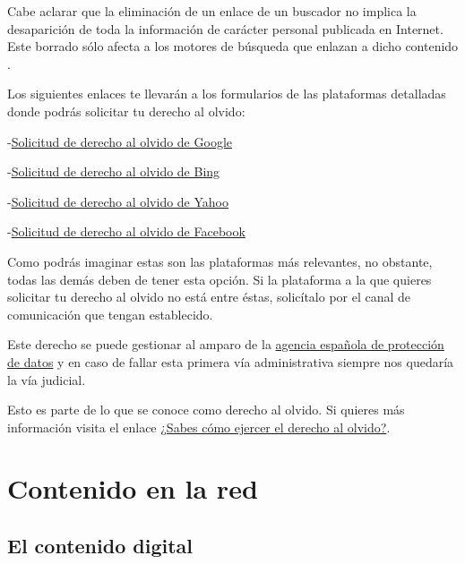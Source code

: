 \documentclass[
  a4paper,
  openany]{book}
\begin{document}
Cabe aclarar que la eliminación de un enlace de un buscador no implica la desaparición de toda la información de carácter personal publicada en Internet. Este borrado sólo afecta a los motores de búsqueda que enlazan a dicho contenido \citep{OSI-derecho-al-olvido}.

Los siguientes enlaces te llevarán a los formularios de las plataformas detalladas donde podrás solicitar tu derecho al olvido:

-\href{https://support.google.com/websearch/troubleshooter/3111061?hl=es}{Solicitud de derecho al olvido de Google}

-\href{https://help.bing.microsoft.com/\#apex/18/ES/10013/-1/ES}{Solicitud de derecho al olvido de Bing}

-\href{https://es-us.ayuda.yahoo.com/kb/Eliminaci\%C3\%B3n-de-resultados-de-b\%C3\%BAsqueda-de-Yahoo-Search-sln4530.html}{Solicitud de derecho al olvido de Yahoo}

-\href{https://www.facebook.com/help/217091804975136}{Solicitud de derecho al olvido de Facebook}

Como podrás imaginar estas son las plataformas más relevantes, no obstante, todas las demás deben de tener esta opción. Si la plataforma a la que quieres solicitar tu derecho al olvido no está entre éstas, solicítalo por el canal de comunicación que tengan establecido.

Este derecho se puede gestionar al amparo de la \href{https://www.aepd.es/es/areas-de-actuacion/internet-y-redes-sociales/derecho-al-olvido}{agencia española de protección de datos} y en caso de fallar esta primera vía administrativa siempre nos quedaría la vía judicial.

Esto es parte de lo que se conoce como derecho al olvido. Si quieres más información visita el enlace \href{https://www.osi.es/es/actualidad/blog/2018/09/19/sabes-como-ejercer-el-derecho-al-olvido}{¿Sabes cómo ejercer el derecho al olvido?}.

\hypertarget{contenido-en-la-red}{%
\chapter{Contenido en la red}\label{contenido-en-la-red}}

\hypertarget{el-contenido-digital}{%
\section{El contenido digital}\label{el-contenido-digital}}
\end{document}
